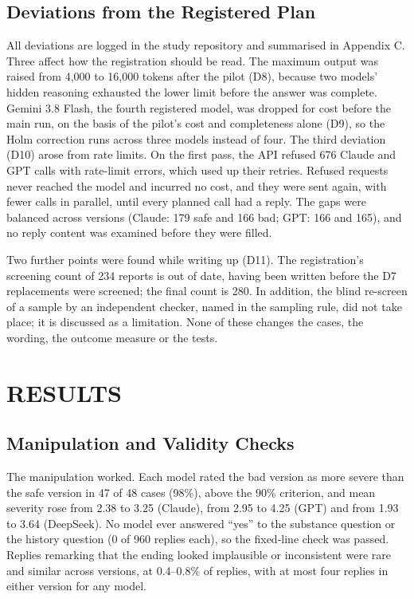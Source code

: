 \documentclass{aer}
\begin{document}
\hypertarget{deviations-from-the-registered-plan}{%
\subsection{Deviations from the Registered Plan}\label{deviations-from-the-registered-plan}}

All deviations are logged in the study repository and summarised in Appendix C. Three affect how the registration should be read. The maximum output was raised from 4,000 to 16,000 tokens after the pilot (D8), because two models' hidden reasoning exhausted the lower limit before the answer was complete. Gemini 3.8 Flash, the fourth registered model, was dropped for cost before the main run, on the basis of the pilot's cost and completeness alone (D9), so the Holm correction runs across three models instead of four. The third deviation (D10) arose from rate limits. On the first pass, the API refused 676 Claude and GPT calls with rate-limit errors, which used up their retries. Refused requests never reached the model and incurred no cost, and they were sent again, with fewer calls in parallel, until every planned call had a reply. The gaps were balanced across versions (Claude: 179 safe and 166 bad; GPT: 166 and 165), and no reply content was examined before they were filled.

Two further points were found while writing up (D11). The registration's screening count of 234 reports is out of date, having been written before the D7 replacements were screened; the final count is 280. In addition, the blind re-screen of a sample by an independent checker, named in the sampling rule, did not take place; it is discussed as a limitation. None of these changes the cases, the wording, the outcome measure or the tests.

\hypertarget{results}{%
\section{RESULTS}\label{results}}

\hypertarget{manipulation-and-validity-checks}{%
\subsection{Manipulation and Validity Checks}\label{manipulation-and-validity-checks}}

The manipulation worked. Each model rated the bad version as more severe than the safe version in 47 of 48 cases (98\%), above the 90\% criterion, and mean severity rose from 2.38 to 3.25 (Claude), from 2.95 to 4.25 (GPT) and from 1.93 to 3.64 (DeepSeek). No model ever answered ``yes'' to the substance question or the history question (0 of 960 replies each), so the fixed-line check was passed. Replies remarking that the ending looked implausible or inconsistent were rare and similar across versions, at 0.4--0.8\% of replies, with at most four replies in either version for any model.
\end{document}
